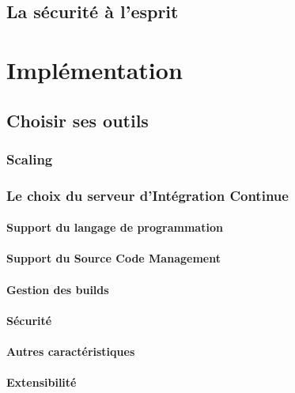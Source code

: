 \documentclass{report}
\begin{document}
      \section{La sécurité à l'esprit}

    \chapter{Implémentation}

      \section{Choisir ses outils}

        \subsection{Scaling}

        \subsection{Le choix du serveur d’Intégration Continue}
          \subsubsection{Support du langage de programmation}

          \subsubsection{Support du Source Code Management}

          \subsubsection{Gestion des builds}

          \subsubsection{Sécurité}

          \subsubsection{Autres caractéristiques}

          \subsubsection{Extensibilité}
\end{document}
